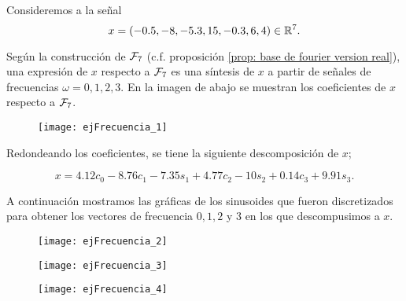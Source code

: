 \begin{ejemplo}
\label{ej: DFT1}
Consideremos a la señal 
\begin{equation}
\label{eq2: 10ab}
x=(-0.5,-8,-5.3,15,-0.3,6,4) \in \mathbb{R}^{7}.
\end{equation}

Según la construcción de $\mathcal{F}_{7}$ (c.f. 
proposición \ref{prop: base de fourier version real}),
una expresión de $x$ respecto a $\mathcal{F}_{7}$ 
es una síntesis de $x$ a partir de señales 
de frecuencias $\omega = 0,1,2,3$. En la imagen de abajo
se muestran los coeficientes de $x$ respecto a $\mathcal{F}_{7}$.

\begin{figure}[H]
	\centering
	\texttt{[image: ejFrecuencia\_1]} 
\end{figure}	

Redondeando los coeficientes, 
se tiene la siguiente descomposición de $x$;

\begin{equation}
\label{eq: analisis x TDF}
x = 4.12 c_{0} - 8.76c_{1} -7.35s_{1}+
4.77c_{2}-10s_{2}+0.14c_{3}+9.91s_{3}.
\end{equation}

\noindent
A continuación mostramos las gráficas
de los sinusoides que fueron discretizados
para obtener los vectores de frecuencia
$0,1,2$ y $3$ en los que descompusimos a $x$.

\begin{figure}[H]
	\centering
	\texttt{[image: ejFrecuencia\_2]} 
\end{figure}	

\begin{figure}[H]
	\centering
	\texttt{[image: ejFrecuencia\_3]} 
\end{figure}	

\begin{figure}[H]
	\centering
	\texttt{[image: ejFrecuencia\_4]} 
\end{figure}	



\end{ejemplo}
